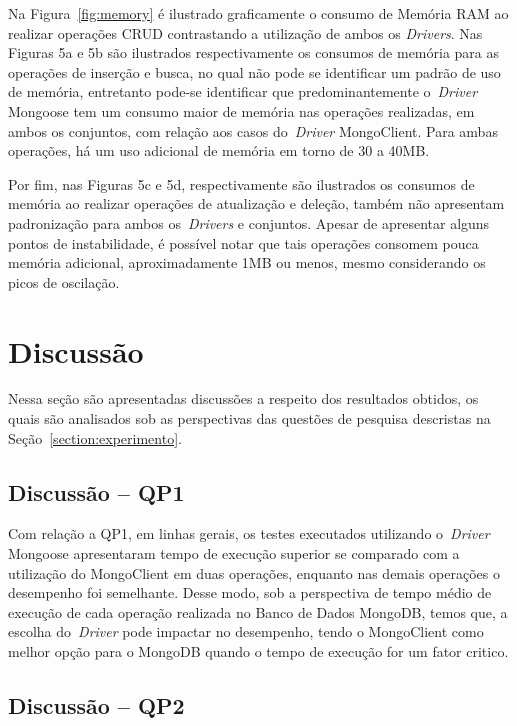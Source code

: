 \documentclass[12pt]{article}
\begin{document}
Na Figura~\ref{fig:memory} é ilustrado graficamente o consumo de Memória RAM ao realizar operações CRUD contrastando a utilização de ambos os \emph{Drivers}.
Nas Figuras 5a e 5b são ilustrados respectivamente os consumos de memória para as operações de inserção e busca, no qual não pode se identificar um padrão de uso de memória, entretanto pode-se identificar que predominantemente o~\emph{Driver} Mongoose tem um consumo maior de memória nas operações realizadas, em ambos os conjuntos, com relação aos casos do~\emph{Driver} MongoClient.
Para ambas operações, há um uso adicional de memória em torno de 30 a 40MB.

Por fim, nas Figuras 5c e 5d, respectivamente são ilustrados os consumos de memória ao realizar operações de atualização e deleção, também não apresentam padronização para ambos os~\emph{Drivers} e conjuntos. 
Apesar de apresentar alguns pontos de instabilidade, é possível notar que tais operações consomem pouca memória adicional, aproximadamente 1MB ou menos, mesmo considerando os picos de oscilação.

\section{Discussão}
\label{section:discussao}

Nessa seção são apresentadas discussões a respeito dos resultados obtidos, os quais são analisados sob as perspectivas das questões de pesquisa descristas na Seção~\ref{section:experimento}.

\subsection{Discussão -- QP1}
\label{q1}

Com relação a QP1, em linhas gerais, os testes executados utilizando o~\emph{Driver} Mongoose apresentaram tempo de execução superior se comparado com a utilização do MongoClient em duas operações, enquanto nas demais operações o desempenho foi semelhante.
Desse modo, sob a perspectiva de tempo médio de execução de cada operação realizada no Banco de Dados MongoDB, temos que, a escolha do~\emph{Driver} pode impactar no desempenho, tendo o MongoClient como melhor opção para o MongoDB quando o tempo de execução for um fator critico.

\subsection{Discussão -- QP2}
\label{q2}
\end{document}
